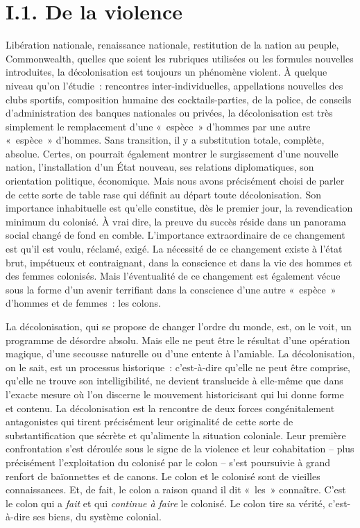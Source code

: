 \documentclass[french,twoside]{book} %
\begin{document}
\section[{I.1. De la violence}]{I.1. De la violence}
\noindent Libération nationale, renaissance nationale, restitution de la nation au peuple, Commonwealth, quelles que soient les rubriques utilisées ou les formules nouvelles introduites, la décolonisation est toujours un phénomène violent. À quelque niveau qu’on l’étudie : rencontres inter-individuelles, appellations nouvelles des clubs sportifs, composition humaine des cocktails-parties, de la police, de conseils d’administration des banques nationales ou privées, la décolonisation est très simplement le remplacement d’une « espèce » d’hommes par une autre « espèce » d’hommes. Sans transition, il y a substitution totale, complète, absolue. Certes, on pourrait également montrer le surgissement d’une nouvelle nation, l’installation d’un État nouveau, ses relations diplomatiques, son orientation politique, économique. Mais nous avons précisément choisi de parler de cette sorte de table rase qui définit au départ toute décolonisation. Son importance inhabituelle est qu’elle constitue, dès le premier jour, la revendication minimum du colonisé. À vrai dire, la preuve du succès réside dans un panorama social changé de fond en comble. L’importance extraordinaire de ce changement est qu’il est voulu, réclamé, exigé. La nécessité de ce changement existe à l’état brut, impétueux et contraignant, dans la conscience et dans la vie des hommes et des femmes colonisés. Mais l’éventualité de ce changement est également vécue sous la forme d’un avenir terrifiant dans la conscience d’une autre « espèce » d’hommes et de femmes : les colons.\par
\bigbreak
\noindent La décolonisation, qui se propose de changer l’ordre du monde, est, on le voit, un programme de désordre absolu. Mais   elle ne peut être le résultat d’une opération magique, d’une secousse naturelle ou d’une entente à l’amiable. La décolonisation, on le sait, est un processus historique : c’est-à-dire qu’elle ne peut être comprise, qu’elle ne trouve son intelligibilité, ne devient translucide à elle-même que dans l’exacte mesure où l’on discerne le mouvement historicisant qui lui donne forme et contenu. La décolonisation est la rencontre de deux forces congénitalement antagonistes qui tirent précisément leur originalité de cette sorte de substantification que sécrète et qu’alimente la situation coloniale. Leur première confrontation s’est déroulée sous le signe de la violence et leur cohabitation – plus précisément l’exploitation du colonisé par le colon – s’est poursuivie à grand renfort de baïonnettes et de canons. Le colon et le colonisé sont de vieilles connaissances. Et, de fait, le colon a raison quand il dit « les » connaître. C’est le colon qui a \emph{fait} et qui \emph{continue à faire} le colonisé. Le colon tire sa vérité, c’est-à-dire ses biens, du système colonial.\par
\end{document}
